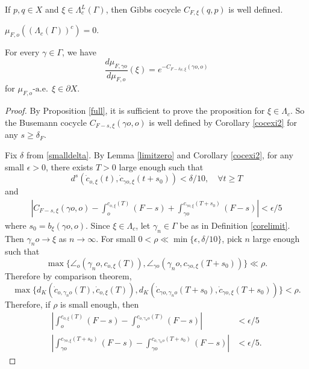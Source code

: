 \documentclass[10pt,a4paper]{amsart}
\def\C{\Gamma}
\def\L{\Lambda}
\def\ae{\text{-a.e.}\ }
\def\c{\gamma}   \def\C{\Gamma}
\def\d{\delta}   %
\def\e{\epsilon}
\def\pX{{\partial X}}
\begin{document}
\begin{corollary}\label{cocexi2}
If $p, q\in X$ and $\xi\in \L_c^L(\C)$, then Gibbs cocycle $C_{F,\xi}(q,p)$ is well defined.    
\end{corollary}

\begin{proposition}\label{full}
    $\mu_{F,o}((\L_c(\C))^c)=0$.
\end{proposition}

\begin{proposition}\label{Busemann2}
For every $\c\in \C$, we have
$$\frac{d\mu_{F,\c o}}{d\mu_{F,o}}(\xi)=e^{-C_{F-\d_F, \xi}(\c o,o)}$$
for $\mu_{F,o} \ae\ \xi\in \pX$.
\end{proposition}

\begin{proof}
By Proposition \ref{full}, it is sufficient to prove the proposition for $\xi\in \L_c$. So the Busemann cocycle $C_{F-s, \xi}(\c o,o)$ is well defined by Corollary \ref{cocexi2} for any $s\ge \d_F$.

Fix $\d$ from \eqref{smalldelta}. By Lemma \ref{limitzero} and Corollary \ref{cocexi2}, for any small $\e>0$, there exists $T>0$ large enough such that 
$$d^s(\dot c_{o,\xi}(t), \dot c_{\c o,\xi}(t+s_0))<\d/10, \quad \forall t\ge T$$ 
and
\begin{equation}\label{e:est1}
\begin{aligned}
\left|C_{F-s,\xi}(\c o,o)-\int_{o}^{c_{o,\xi}(T)}(F-s)+\int_{\c o}^{c_{\c o,\xi}(T+s_0)}(F-s)\right|<\e/5
\end{aligned}
\end{equation}
where $s_0=b_\xi(\c o,o)$. Since $\xi\in \L_c$, let $\c_n\in \C$ be as in Definition \ref{corelimit}. Then $\c_n o\to \xi$ as $n\to \infty$. For small $0<\rho \ll \min\{\e, \d/10\}$, pick $n$ large enough such that 
$$\max\{\angle_o(\c_n o, c_{o,\xi}(T)), \angle_{\c o}(\c_n o, c_{\c o,\xi}(T+s_0))\}\ll \rho.$$
Therefore by comparison theorem,
$$\max\{d_K(\dot c_{o,\c_n o}(T), \dot c_{o,\xi}(T)), d_K(\dot c_{\c o,\c_n o}(T+s_0), \dot c_{\c o,\xi}(T+s_0))\}< \rho.$$
Therefore, if $\rho$ is small enough, then
\begin{equation}\label{e:est2}
\begin{aligned}
\left|\int_{o}^{c_{o,\xi}(T)}(F-s)-\int_{o}^{c_{o,\c_n o}(T)}(F-s)\right|&<\e/5\\
\left|\int_{\c o}^{c_{\c o,\xi}(T+s_0)}(F-s)-\int_{\c o}^{c_{o,\c_n o}(T+s_0)}(F-s)\right|&<\e/5.
\end{aligned}
\end{equation}


\end{proof}
\end{document}
